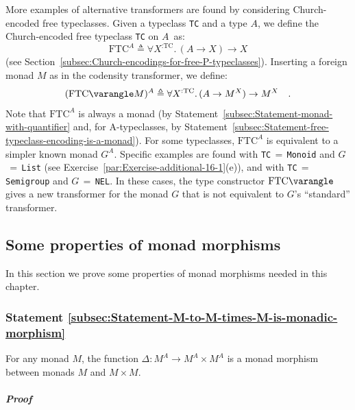 More examples of alternative transformers are found by considering
Church-encoded free typeclasses. Given a typeclass \lstinline!TC!
and a type $A$, we define the Church-encoded free typeclass \lstinline!TC!
on $A$~as:
\[
\text{FTC}^{A}\triangleq\forall X^{:\text{TC}}.\,(A\rightarrow X)\rightarrow X
\]
(see Section~\ref{subsec:Church-encodings-for-free-P-typeclasses}).
Inserting a foreign monad $M$ as in the codensity transformer, we
define:
\[
(\text{FTC}\varangle M)^{A}\triangleq\forall X^{:\text{TC}}.\,(A\rightarrow M^{X})\rightarrow M^{X}\quad.
\]
Note that $\text{FTC}^{A}$ is always a monad (by Statement~\ref{subsec:Statement-monad-with-quantifier}
and, for A-typeclasses, by Statement~\ref{subsec:Statement-free-typeclass-encoding-is-a-monad}).
For some typeclasses, $\text{FTC}^{A}$ is equivalent to a simpler
known monad $G^{A}$. Specific examples are found with \lstinline!TC!$\,=\,$\lstinline!Monoid!
and $G$$\,=\,$\lstinline!List! (see Exercise~\ref{par:Exercise-additional-16-1}(e)),
and with \lstinline!TC!$\,=\,$\lstinline!Semigroup! and $G$$\,=\,$\lstinline!NEL!.
In these cases,  the type constructor $\text{FTC}\varangle$ gives
a new transformer for the monad $G$ that is not equivalent to $G$\textsf{'}s
\textsf{``}standard\textsf{''} transformer.

\subsection{Some properties of monad morphisms}

In this section we prove some properties of monad morphisms needed
in this chapter.

\subsubsection{Statement \label{subsec:Statement-M-to-M-times-M-is-monadic-morphism}\ref{subsec:Statement-M-to-M-times-M-is-monadic-morphism}}

For any monad $M$, the function $\Delta:M^{A}\rightarrow M^{A}\times M^{A}$
is a monad morphism between monads $M$ and $M\times M$.

\subparagraph{Proof}

